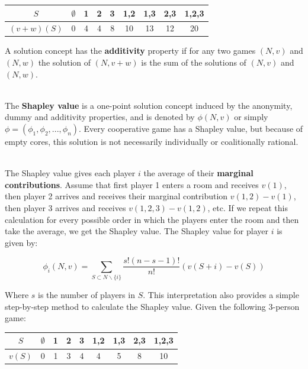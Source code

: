 \documentclass[12pt]{article}
\begin{document}
\begin{table}[h]
    \centering
    \begin{tabular}{|c|cccccccc|}
    \hline
    $S$ & $\emptyset$ & 1 & 2 & 3 & 1,2 & 1,3 & 2,3 & 1,2,3 \\ \hline
    $(v + w)(S)$ & 0 & 4 & 4 & 8 & 10 & 13 & 12 & 20 \\ \hline
    \end{tabular}
\end{table}

\noindent
A solution concept has the \textbf{additivity} property if for any two games $(N, v)$ and $(N, w)$ the solution of $(N, v + w)$ is the sum of the solutions of $(N, v)$ and $(N, w)$.

\noindent
\\
The \textbf{Shapley value} is a one-point solution concept induced by the anonymity, dummy and additivity properties, and is denoted by $\phi(N, v)$ or simply $\phi = (\phi_1, \phi_2, ... , \phi_n)$.
Every cooperative game has a Shapley value, but because of empty cores, this solution is not necessarily individually or coalitionally rational.

\noindent
\\
The Shapley value gives each player $i$ the average of their \textbf{marginal contributions}.
Assume that first player 1 enters a room and receives $v(1)$, then player 2 arrives and receives their marginal contribution $v(1, 2) - v(1)$, then player 3 arrives and receives $v(1, 2, 3) - v(1, 2)$, etc.
If we repeat this calculation for every possible order in which the players enter the room and then take the average, we get the Shapley value.
The Shapley value for player $i$ is given by:

\[ \phi_i(N, v) = \sum_{S \subset N \backslash \{i\}} \frac{s!(n - s - 1)!}{n!} (v(S + i) - v(S)) \]

\noindent
Where $s$ is the number of players in $S$.
This interpretation also provides a simple step-by-step method to calculate the Shapley value.
Given the following 3-person game:

\begin{table}[h!]
    \centering
    \begin{tabular}{|c|cccccccc|}
    \hline
    $S$ & $\emptyset$ & 1 & 2 & 3 & 1,2 & 1,3 & 2,3 & 1,2,3 \\ \hline
    $v(S)$ & 0 & 1 & 3 & 4 & 4 & 5 & 8 & 10 \\ \hline
    \end{tabular}
\end{table}
\end{document}
